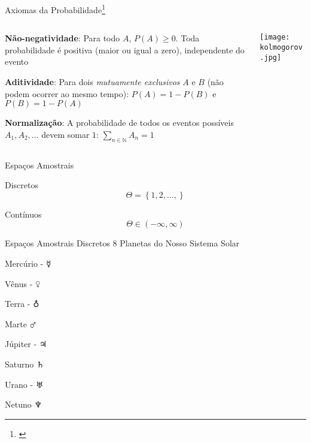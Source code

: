 \begin{frame}{Axiomas da Probabilidade\footnote{\textcite{kolmogorovFoundationsTheoryProbability1933}}}
	\begin{columns}
		\begin{column}{0.8\textwidth}
			\begin{vfilleditems}
				\item \textbf{Não-negatividade}: Para todo $A$, $P(A) \geq 0$.
				Toda probabilidade é positiva (maior ou igual a zero), independente do
				evento
				\item \textbf{Aditividade}: Para dois \textit{mutuamente exclusivos}
				$A$ e $B$ (não podem ocorrer ao mesmo tempo):
				$P(A) = 1 - P(B)$ e $P(B) = 1 - P(A)$
				\item \textbf{Normalização}: A probabilidade de todos os eventos
				possíveis $A_1, A_2, \dots$ devem somar $1$:
				$\sum_{n \in \mathbb{N}} A_n = 1$
			\end{vfilleditems}
		\end{column}
		\begin{column}{0.2\textwidth}
			\centering
			\texttt{[image: kolmogorov.jpg]}
		\end{column}
	\end{columns}
\end{frame}

\begin{frame}{Espaços Amostrais}
	\begin{vfilleditems}
		\item Discretos $$\Theta = \left\{1, 2, \ldots, \right\}$$
		\item Contínuos $$\Theta \in \left(-\infty, \infty \right)$$
	\end{vfilleditems}
\end{frame}

\begin{frame}{Espaços Amostrais Discretos}
	8 Planetas do Nosso Sistema Solar
	\begin{vfilleditems}
		\item Mercúrio - $\mercury$
		\item Vênus - $\venus$
		\item Terra - $\earth$
		\item Marte $\mars$
		\item Júpiter - $\jupiter$
		\item Saturno $\saturn$
		\item Urano - $\uranus$
		\item Netuno $\neptune$
	\end{vfilleditems}
\end{frame}


